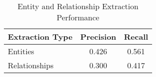\begin{table}[h]
\centering
\caption{Entity and Relationship Extraction Performance}
\label{tab:extraction-performance}
\begin{tabular}{lcc}
\toprule
\textbf{Extraction Type} & \textbf{Precision} & \textbf{Recall} \\
\midrule
Entities & 0.426 & 0.561 \\
Relationships & 0.300 & 0.417 \\
\bottomrule
\end{tabular}
\end{table}